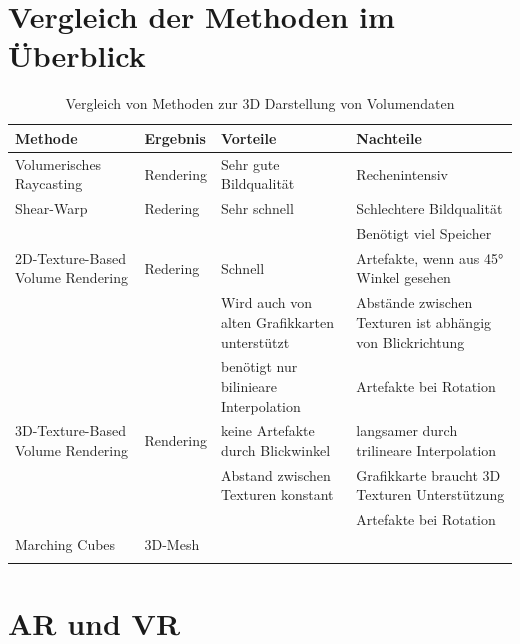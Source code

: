 

\section{Vergleich der Methoden im Überblick}											 %

\begin{longtable} {p{}p{}p{}p{}}
 
Methode & Ergebnis & Vorteile & Nachteile \\ 
\toprule 
Volumerisches Raycasting & Rendering  & Sehr gute Bildqualität & Rechenintensiv \\
\midrule 
Shear-Warp & Redering & Sehr schnell& Schlechtere Bildqualität\\
 & & & Benötigt viel Speicher\\
\midrule 
2D-Texture-Based Volume Rendering & Redering & Schnell & Artefakte, wenn aus 45° Winkel gesehen\\
 & &  Wird auch von alten Grafikkarten unterstützt & Abstände zwischen Texturen ist abhängig von Blickrichtung \\
 & & benötigt nur bilinieare Interpolation &  Artefakte bei Rotation\\ 
\midrule 
3D-Texture-Based Volume Rendering & Rendering & keine Artefakte durch Blickwinkel & langsamer durch trilineare Interpolation \\
 & &  Abstand zwischen Texturen konstant & Grafikkarte braucht 3D Texturen Unterstützung\\ 
 & & & Artefakte bei Rotation\\
\midrule 
Marching Cubes & 3D-Mesh &  &\\ 
\bottomrule
\caption{\label{tab:volumeRenderingVergleich}Vergleich von Methoden zur 3D Darstellung von Volumendaten}
\end{longtable}

\section{AR und VR}		
\label{arVr}							 %

